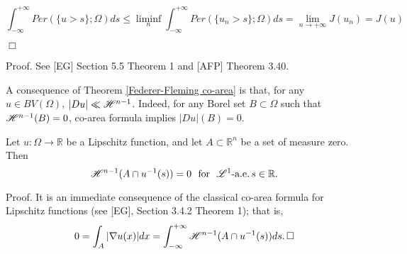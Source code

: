 \[ \int_{-\infty}^{+\infty} Per(\{u > s\}; \Omega) ds \le \liminf\limits_{n} \int_{-\infty}^{+\infty} Per(\{u_{n} > s\}; \Omega) ds = \lim_{n \to +\infty} J(u_{n}) = J(u) \]

$\Box$

Proof. See [EG] Section 5.5 Theorem 1 and [AFP] Theorem 3.40.

\begin{remark} \label{BVabscont} A consequence of Theorem \ref{Federer-Fleming co-area} is that, for any $u \in BV(\Omega)$, $|Du| \ll \mathscr{H}^{n - 1}$. Indeed, for any Borel set $B \subset \Omega$ such that $\mathscr{H}^{n - 1}(B) = 0$, co-area formula implies $|Du|(B) = 0$.
\end{remark}

\begin{lemma} \label{nullcoarea} Let $u : \Omega \to \mathbb{R}$ be a Lipschitz function, and let $A \subset \mathbb{R}^{n}$ be a set of measure zero.
\\
Then 
\[ \Haus{n-1}(A \cap u^{-1}(s) ) = 0 \  \ \text{for} \ \ \Leb{1}\text{-a.e.} \, s \in \mathbb{R}. \]
\end{lemma}

Proof. It is an immediate consequence of the classical co-area formula for Lipschitz functions (see [EG], Section 3.4.2 Theorem 1); that is,
\[ 0 = \int_{A} |\nabla u(x)| dx = \int_{-\infty}^{+\infty} \mathscr{H}^{n-1}(A \cap u^{-1}(s)) ds. \, \Box \]